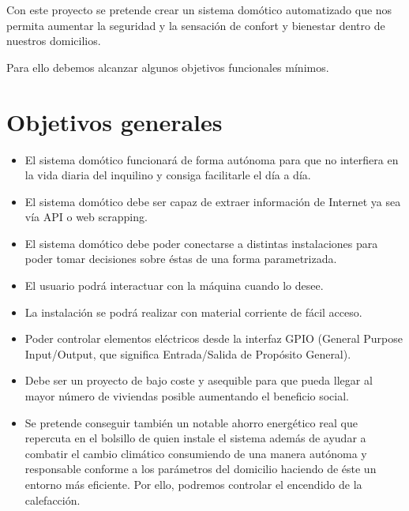 
Con este proyecto se pretende crear un sistema domótico automatizado que nos permita aumentar la seguridad y la sensación de confort y bienestar dentro de nuestros domicilios.

Para ello debemos alcanzar algunos objetivos funcionales mínimos.

\section{Objetivos generales}

\begin{itemize}
    \item El sistema domótico funcionará de forma autónoma para que no interfiera en la vida diaria del inquilino y consiga facilitarle el día a día.
    \item El sistema domótico debe ser capaz de extraer información de Internet ya sea vía API o web scrapping.
    \item El sistema domótico debe poder conectarse a distintas instalaciones para poder tomar decisiones sobre éstas de una forma parametrizada.
    \item El usuario podrá interactuar con la máquina cuando lo desee.
    \item La instalación se podrá realizar con material corriente de fácil acceso.
    \item Poder controlar elementos eléctricos desde la interfaz GPIO (General Purpose Input/Output, que significa Entrada/Salida de Propósito General).
    \item Debe ser un proyecto de bajo coste y asequible para que pueda llegar al mayor número de viviendas posible aumentando el beneficio social.
    \item Se pretende conseguir también un notable ahorro energético real que repercuta en el bolsillo de quien instale el sistema además de ayudar a combatir el cambio climático consumiendo de una manera autónoma y responsable conforme a los parámetros del domicilio haciendo de éste un entorno más eficiente. Por ello, podremos controlar el encendido de la calefacción.
\end{itemize}


